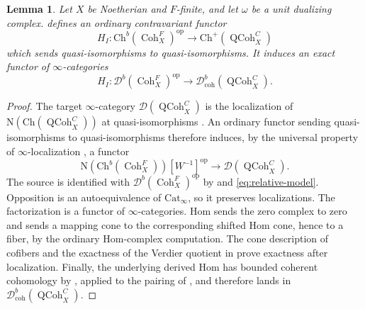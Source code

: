 \documentclass[11pt]{amsart}
\newcommand{\op}{{\operatorname{op}}}
\newcommand{\QCoh}{\operatorname{{QCoh}}}
\newcommand{\Coh}{\operatorname{{Coh}}}
\newcommand{\Cat}{\mathrm{Cat}}
\newcommand{\Ch}{\mathrm{Ch}}
\newcommand{\Db}{\mathcal D^b}
\theoremstyle{plain}
\newtheorem{lemma}[lemma]{Lemma}
\theoremstyle{definition}
\numberwithin{equation}{section}
\begin{document}
\begin{lemma}\label{lem:relative-hom}
Let $X$ be Noetherian and $F$-finite, and let $\omega$ be a unit dualizing complex.
 defines an ordinary contravariant functor
\[
 H_I:\Ch^b(\Coh^F_X)^{\op}
           \longrightarrow\Ch^+(\QCoh^C_X)
\]
which sends quasi-isomorphisms to quasi-isomorphisms.
It induces an exact functor of $\infty$-categories
\[
 H_I:\Db(\Coh^F_X)^{\op}\longrightarrow
                     \mathcal D^b_{\mathrm{coh}}(\QCoh^C_X).
\]
\end{lemma}
\begin{proof}
The target $\infty$-category $\mathcal D(\QCoh^C_X)$ is the localization of $\mathrm N(\Ch(\QCoh^C_X))$ at quasi-isomorphisms \cite[Proposition 1.3.5.15]{HA}.
An ordinary functor sending quasi-isomorphisms to quasi-isomorphisms therefore induces, by the universal property of $\infty$-localization \cite[\href{https://kerodon.net/tag/01MP}{Tag 01MP}]{Kerodon}, a functor
\[
 \mathrm N(\Ch^b(\Coh^F_X))[W^{-1}]^{\op}
 \longrightarrow\mathcal D(\QCoh^C_X).
\]
The source is identified with $\Db(\Coh^F_X)^{\op}$ by  and \eqref{eq:relative-model}.
Opposition is an autoequivalence of $\Cat_\infty$, so it preserves localizations.
The factorization is a functor of $\infty$-categories.
Hom sends the zero complex to zero and sends a mapping cone to the corresponding shifted Hom cone, hence to a fiber, by the ordinary Hom-complex computation.
The cone description of cofibers \cite[Remark 1.3.2.17]{HA} and the exactness of the Verdier quotient in  prove exactness after localization.
Finally, the underlying derived Hom has bounded coherent cohomology by \cite[Lemma 4.2.3]{Bau}, applied to the pairing of \cite[Proposition 4.1.3]{Bau}, and therefore lands in $\mathcal D^b_{\mathrm{coh}}(\QCoh^C_X)$.
\end{proof}
\end{document}
